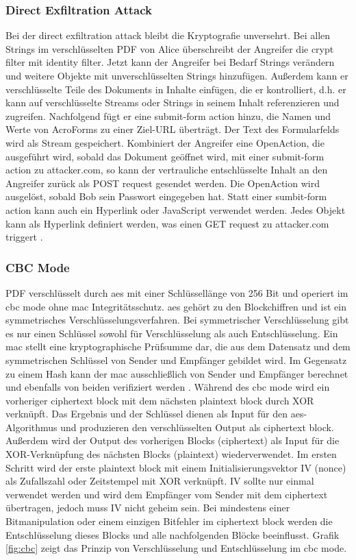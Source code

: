 \subsubsection{Direct Exfiltration Attack}
Bei der direct exfiltration attack bleibt die Kryptografie unversehrt. Bei allen Strings im verschlüsselten PDF von Alice überschreibt der Angreifer die crypt filter mit identity filter. Jetzt kann der Angreifer bei Bedarf Strings verändern und weitere Objekte mit unverschlüsselten Strings hinzufügen. Außerdem kann er verschlüsselte Teile des Dokuments in Inhalte einfügen, die er kontrolliert, d.h. er kann auf verschlüsselte Streams oder Strings in seinem Inhalt referenzieren und zugreifen. Nachfolgend fügt er eine submit-form action hinzu, die Namen und Werte von AcroForms zu einer Ziel-URL überträgt. Der Text des Formularfelds wird als Stream gespeichert. Kombiniert der Angreifer eine OpenAction, die ausgeführt wird, sobald das Dokument geöffnet wird, mit einer submit-form action zu attacker.com, so kann der vertrauliche entschlüsselte Inhalt an den Angreifer zurück als POST request gesendet werden. Die OpenAction wird ausgelöst, sobald Bob sein Passwort eingegeben hat. Statt einer sumbit-form action kann auch ein Hyperlink oder JavaScript verwendet werden. Jedes Objekt kann als Hyperlink definiert werden, was einen GET request zu attacker.com triggert \cite{ccc-break-pdf, pdfex}. 

\subsubsection{CBC Mode}
PDF verschlüsselt durch \gls{aes} mit einer Schlüssellänge von 256 Bit und operiert im \gls{cbc} mode ohne \gls{mac} Integritätsschutz. \gls{aes} gehört zu den Blockchiffren und ist ein symmetrisches Verschlüsselungsverfahren. Bei symmetrischer Verschlüsselung gibt es nur einen Schlüssel sowohl für Verschlüsselung als auch Entschlüsselung. Ein \gls{mac} stellt eine kryptographische Prüfsumme dar, die aus dem Datensatz und dem symmetrischen Schlüssel von Sender und Empfänger gebildet wird. Im Gegensatz zu einem Hash kann der \gls{mac} ausschließlich von Sender und Empfänger berechnet und ebenfalls von beiden verifiziert werden \cite{crypto-web}. Während des \gls{cbc} mode wird ein vorheriger ciphertext block mit dem nächsten plaintext block durch XOR verknüpft. Das Ergebnis und der Schlüssel dienen als Input für den \gls{aes}-Algorithmus und produzieren den verschlüsselten Output als ciphertext block. Außerdem wird der Output des vorherigen Blocks (ciphertext) als Input für die XOR-Verknüpfung des nächsten Blocks (plaintext) wiederverwendet. Im ersten Schritt wird der erste plaintext block mit einem Initialisierungsvektor IV (nonce) als Zufallszahl oder Zeitstempel mit XOR verknüpft. IV sollte nur einmal verwendet werden und wird dem Empfänger vom Sender mit dem ciphertext übertragen, jedoch muss IV nicht geheim sein. Bei mindestens einer Bitmanipulation oder einem einzigen Bitfehler im ciphertext block werden die Entschlüsselung dieses Blocks und alle nachfolgenden Blöcke beeinflusst. Grafik \ref{fig:cbc} zeigt das Prinzip von Verschlüsselung und Entschlüsselung im \gls{cbc} mode. 

